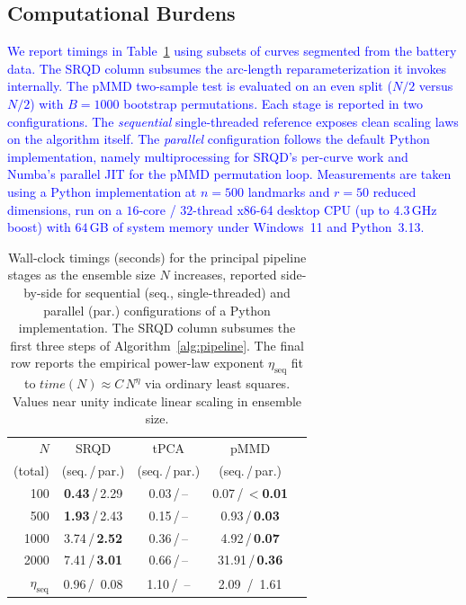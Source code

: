 \documentclass[pdflatex,iicol]{sn-jnl}%
\theoremstyle{thmstyleone}%
\theoremstyle{thmstyletwo}%
\theoremstyle{thmstylethree}%
\begin{document}
\subsection{Computational Burdens}
\textcolor{blue}{We report timings in Table~\ref{tab:timing} using subsets of curves segmented from the battery data. The SRQD column subsumes the arc-length reparameterization it invokes internally. The pMMD two-sample test is evaluated on an even split ($N/2$ versus $N/2$) with $B = 1000$ bootstrap permutations. Each stage is reported in two configurations. The \emph{sequential} single-threaded reference exposes clean scaling laws on the algorithm itself. The \emph{parallel} configuration follows the default Python implementation, namely multiprocessing for SRQD's per-curve work and Numba's parallel JIT for the pMMD permutation loop. Measurements are taken using a Python implementation at $n=500$ landmarks and $r=50$ reduced dimensions, run on a $16$-core / $32$-thread x86-64 desktop CPU (up to $4.3$\,GHz boost) with $64$\,GB of system memory under Windows~11 and Python~3.13.}

\begin{table}
    \centering
    \begin{tabular}{r|cccc}
        $N$ &  SRQD & tPCA & pMMD \\
        (total) & (seq.\,/\,par.) & (seq.\,/\,par.) & (seq.\,/\,par.) \\
        \hline
         100 & \textbf{0.43}\,/\,2.29 & 0.03\,/\,-- &  0.07\,/\,$<$\textbf{0.01} \\
         500 & \textbf{1.93}\,/\,2.43 & 0.15\,/\,-- &  0.93\,/\,\textbf{0.03} \\
        1000 & 3.74\,/\,\textbf{2.52} & 0.36\,/\,-- &  4.92\,/\,\textbf{0.07} \\
        2000 & 7.41\,/\,\textbf{3.01} & 0.66\,/\,-- & 31.91\,/\,\textbf{0.36} \\
        \hline
        $\eta_{\text{seq}}$ & 0.96\,/\, 0.08 & 1.10\,/\, -- & 2.09 \,/\, 1.61 \\
    \end{tabular}
    \caption{Wall-clock timings (seconds) for the principal pipeline stages as the ensemble size $N$ increases, reported side-by-side for sequential (seq., single-threaded) and parallel (par.) configurations of a Python implementation. The SRQD column subsumes the first three steps of Algorithm~\ref{alg:pipeline}. The final row reports the empirical power-law exponent $\eta_{\text{seq}}$ fit to $time(N) \approx C\, N^{\eta}$ via ordinary least squares. Values near unity indicate linear scaling in ensemble size.}
    \label{tab:timing}
\end{table}
\end{document}
